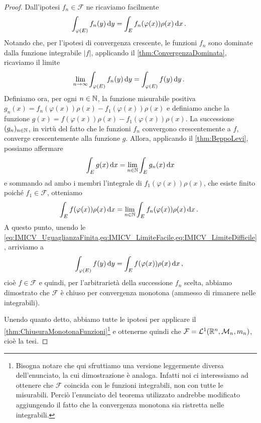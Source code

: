 \begin{proof}
	Dall'ipotesi $f_n\in\mathcal F$ ne ricaviamo facilmente
	\begin{equation}\label{eq:IMICV_UguaglianzaFinita}
		\int_{\varphi(E)} f_n(y)\,\mathrm d y = \int_E f_n(\varphi(x))\rho(x)\,\mathrm d x\, \text{. }
	\end{equation}
	Notando che, per l'ipotesi di convergenza crescente, le funzioni $f_n$ sono dominate dalla funzione integrabile $|f|$, applicando il \cref{thm:ConvergenzaDominata}, ricaviamo il limite
	\begin{equation}\label{eq:IMICV_LimiteFacile}
		\lim_{n\to\infty} \int_{\varphi(E)} f_n(y)\,\mathrm d y = \int_{\varphi(E)} f(y) \,\mathrm d y\, \text{. }
	\end{equation}
	Definiamo ora, per ogni $n\in\mathbb N$, la funzione misurabile positiva $g_n(x)=f_n(\varphi(x))\rho(x)-f_1(\varphi(x))\rho(x)$ e definiamo anche la funzione $g(x)=f(\varphi(x))\rho(x)-f_1(\varphi(x))\rho(x)$.
	La successione $(g_n)_{n\in\mathbb N}$, in virtù del fatto che le funzioni $f_n$ convergono crescentemente a $f$, converge crescentemente alla funzione $g$.
	Allora, applicando il \cref{thm:BeppoLevi}, possiamo affermare
	\begin{equation*}
		\int_E g(x)\,\mathrm d x=\lim_{n\in\mathbb N} \int_E g_n(x)\,\mathrm d x
	\end{equation*}
	e sommando ad ambo i membri l'integrale di $f_1(\varphi(x))\rho(x)$, che esiste finito poiché $f_1\in\mathcal F$, otteniamo
	\begin{equation}\label{eq:IMICV_LimiteDifficile}
		\int_E f(\varphi(x))\rho(x)\,\mathrm d x=\lim_{n\in\mathbb N} \int_E f_n(\varphi(x))\rho(x)\,\mathrm d x \, \text{. }
	\end{equation}
	A questo punto, unendo le \cref{eq:IMICV_UguaglianzaFinita,eq:IMICV_LimiteFacile,eq:IMICV_LimiteDifficile}, arriviamo a
	\begin{equation*}
		\int_{\varphi(E)} f(y)\,\mathrm d y=\int_E f(\varphi(x))\rho(x)\,\mathrm d x\, \text{, }
	\end{equation*}
	cioè $f\in\mathcal F$ e quindi, per l'arbitrarietà della successione $f_n$ scelta, abbiamo dimostrato che $\mathcal F$ è chiuso per convergenza monotona (ammesso di rimanere nelle integrabili).
	
	Unendo quanto detto, abbiamo tutte le ipotesi per applicare il \cref{thm:ChiusuraMonotonaFunzioni}\footnote{Bisogna notare che qui sfruttiamo una versione leggermente diversa dell'enunciato, la cui dimostrazione è analoga. Infatti noi ci interessiamo ad ottenere che $\mathcal F$ coincida con le funzioni integrabili, non con tutte le misurabili. 
	Perciò l'enunciato del teorema utilizzato andrebbe modificato aggiungendo il fatto che la convergenza monotona sia ristretta nelle integrabili.} e ottenerne quindi che $\mathcal F=\mathcal L^1(\mathbb R^n,\mathcal M_n,m_n)$, cioè la tesi.
\end{proof}

